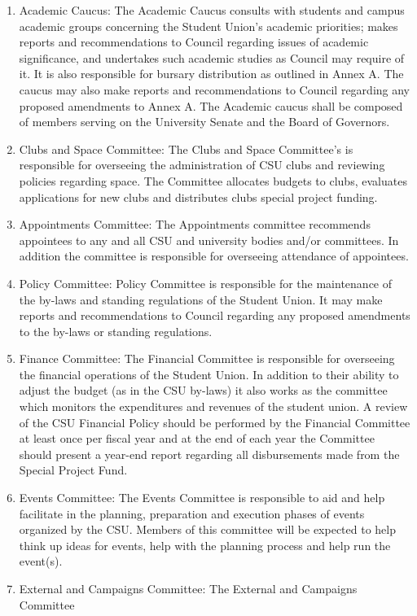 \documentclass[oneside]{book}
\begin{document}
\begin{enumerate}
\begin{enumerate}
\item Academic Caucus: The Academic Caucus consults with students and campus
academic groups concerning the Student Union's academic priorities;
makes reports and recommendations to Council regarding issues of academic
significance, and undertakes such academic studies as Council may
require of it. It is also responsible for bursary distribution as
outlined in Annex A. The caucus may also make reports and recommendations
to Council regarding any proposed amendments to Annex A. The Academic
caucus shall be composed of members serving on the University Senate
and the Board of Governors. 
\item Clubs and Space Committee: The Clubs and Space Committee's is responsible
for overseeing the administration of CSU clubs and reviewing policies
regarding space. The Committee allocates budgets to clubs, evaluates
applications for new clubs and distributes clubs special project funding. 
\item Appointments Committee: The Appointments committee recommends appointees
to any and all CSU and university bodies and/or committees. In addition
the committee is responsible for overseeing attendance of appointees. 
\item Policy Committee: Policy Committee is responsible for the maintenance
of the by-laws and standing regulations of the Student Union. It may
make reports and recommendations to Council regarding any proposed
amendments to the by-laws or standing regulations. 
\item Finance Committee: The Financial Committee is responsible for overseeing
the financial operations of the Student Union. In addition to their
ability to adjust the budget (as in the CSU by-laws) it also works
as the committee which monitors the expenditures and revenues of the
student union. A review of the CSU Financial Policy should be performed
by the Financial Committee at least once per fiscal year and at the
end of each year the Committee should present a year-end report regarding
all disbursements made from the Special Project Fund. 
\item Events Committee: The Events Committee is responsible to aid and help
facilitate in the planning, preparation and execution phases of events
organized by the CSU. Members of this committee will be expected to
help think up ideas for events, help with the planning process and
help run the event(s). 
\item External and Campaigns Committee: The External and Campaigns Committee

\end{enumerate}
\end{enumerate}
\end{document}
